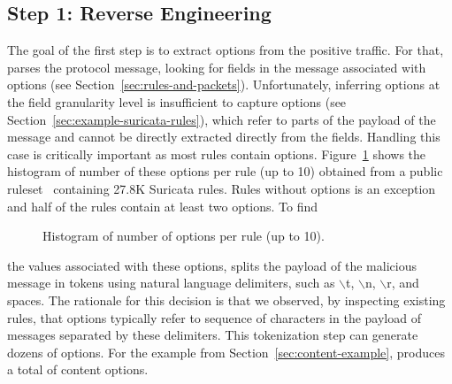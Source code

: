 \documentclass[runningheads]{llncs}
\begin{document}
\subsection{Step 1: Reverse Engineering}
\pgfplotsset{width=6cm,compat=1.8}
The goal of the first step is to extract options from the positive
traffic. For that, \tname{} parses the protocol message, looking for
fields in the message associated with options (see
Section~\ref{sec:rules-and-packets}).
Unfortunately, inferring options at the field granularity
level is insufficient to capture  options (see
Section~\ref{sec:example-suricata-rules}), which refer to parts of the
payload of the message and cannot be directly extracted directly from
the fields. Handling this case is critically important as most rules
contain 
options. Figure~\ref{fig:distribution-contents} shows the histogram of
number of these options per rule (up to 10) obtained from a public
ruleset~\cite{emerging-threats-open} containing 27.8K Suricata
rules. Rules without  options is an exception and half
of the rules contain at least two  options.  To find
\begin{figure}
  \centering
  \vspace{-4ex}
  \caption{\label{fig:distribution-contents}Histogram of number of
     options per rule (up to 10).}
\end{figure}
the values associated with these options, \tname{} splits the payload
of the malicious message in tokens using natural language delimiters,
such as $\backslash$t, $\backslash$n, $\backslash$r, and spaces. The
rationale for this decision is that we observed, by inspecting
existing rules, that  options typically refer to
sequence of characters in the payload of messages separated by these
delimiters. This tokenization step can generate dozens of options. For
the example from Section~\ref{sec:content-example}, \tname{} produces
a total of  content options.
\end{document}
